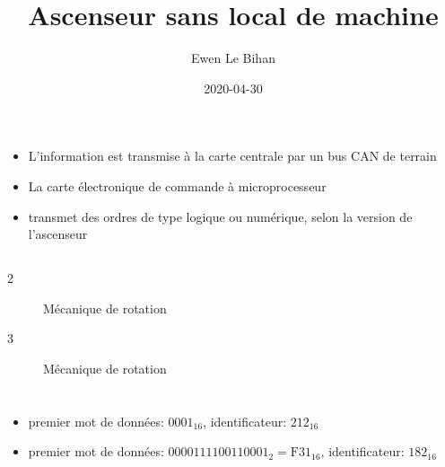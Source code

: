 \documentclass{article}
\title{Ascenseur sans local de machine}
\author{Ewen Le Bihan}
\date{2020-04-30}
\begin{document}
\maketitle

\section{}

\subsection{}

\begin{itemize}
    \item L'information est transmise à la carte centrale par un bus CAN de terrain
    \item La carte électronique de commande à microprocesseur
    \item transmet des ordres de type logique ou numérique, selon la version de l'ascenseur
\end{itemize}

\subsection{}

\begin{description}
    \item[2] Mécanique de rotation
    \item[3] Mécanique de rotation
\end{description}

\section{}

\begin{itemize}
    \item premier mot de données: $\text{0001}_{16}$, identificateur: $\text{212}_{16}$
    \item premier mot de données: $0000111100110001_2 = \text{F31}_{16}$, identificateur: $182_{16}$
\end{itemize}
\end{document}
